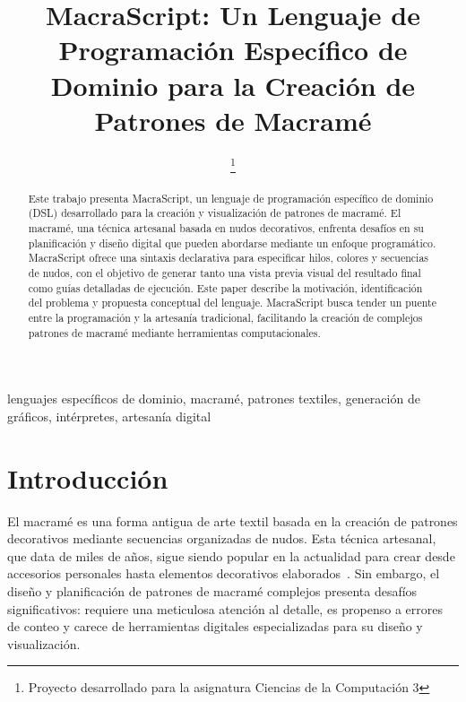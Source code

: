 \documentclass[conference]{IEEEtran}
\begin{document}
\title{MacraScript: Un Lenguaje de Programación Específico de Dominio para la Creación de Patrones de Macramé}

\author{
\thanks{Proyecto desarrollado para la asignatura Ciencias de la Computación 3}}

\maketitle

\begin{abstract}
Este trabajo presenta MacraScript, un lenguaje de programación específico de dominio (DSL) desarrollado para la creación y visualización de patrones de macramé. El macramé, una técnica artesanal basada en nudos decorativos, enfrenta desafíos en su planificación y diseño digital que pueden abordarse mediante un enfoque programático. MacraScript ofrece una sintaxis declarativa para especificar hilos, colores y secuencias de nudos, con el objetivo de generar tanto una vista previa visual del resultado final como guías detalladas de ejecución. Este paper describe la motivación, identificación del problema y propuesta conceptual del lenguaje. MacraScript busca tender un puente entre la programación y la artesanía tradicional, facilitando la creación de complejos patrones de macramé mediante herramientas computacionales.
\end{abstract}

\begin{IEEEkeywords}
lenguajes específicos de dominio, macramé, patrones textiles, generación de gráficos, intérpretes, artesanía digital
\end{IEEEkeywords}

\section{Introducción}
El macramé es una forma antigua de arte textil basada en la creación de patrones decorativos mediante secuencias organizadas de nudos. Esta técnica artesanal, que data de miles de años, sigue siendo popular en la actualidad para crear desde accesorios personales hasta elementos decorativos elaborados~\cite{karner2005}. Sin embargo, el diseño y planificación de patrones de macramé complejos presenta desafíos significativos: requiere una meticulosa atención al detalle, es propenso a errores de conteo y carece de herramientas digitales especializadas para su diseño y visualización.
\end{document}

